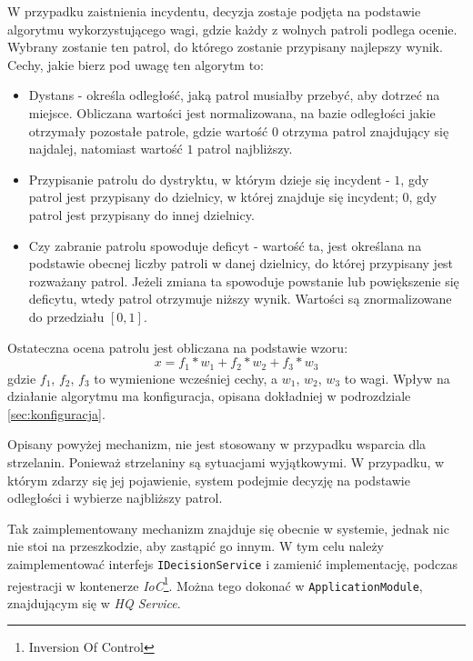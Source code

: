 \par W przypadku zaistnienia incydentu, decyzja zostaje podjęta na podstawie algorytmu wykorzystującego wagi, gdzie każdy z wolnych patroli podlega ocenie. Wybrany zostanie ten patrol, do którego zostanie przypisany najlepszy wynik. Cechy, jakie bierz pod uwagę ten algorytm to:
\begin{itemize}
    \item Dystans - określa odległość, jaką patrol musiałby przebyć, aby dotrzeć na miejsce. Obliczana wartości jest normalizowana, na bazie odległości jakie otrzymały pozostałe patrole, gdzie wartość $0$ otrzyma patrol znajdujący się najdalej, natomiast wartość $1$ patrol najbliższy.
    \item Przypisanie patrolu do dystryktu, w którym dzieje się incydent - $1$, gdy patrol jest przypisany do dzielnicy, w której znajduje się incydent; $0$, gdy patrol jest przypisany do innej dzielnicy.
    \item Czy zabranie patrolu spowoduje deficyt - wartość ta, jest określana na podstawie obecnej liczby patroli w danej dzielnicy, do której przypisany jest rozważany patrol. Jeżeli zmiana ta spowoduje powstanie lub powiększenie się deficytu, wtedy patrol otrzymuje niższy wynik. Wartości są znormalizowane do przedziału $[0,1]$. 
\end{itemize}

\par Ostateczna ocena patrolu jest obliczana na podstawie wzoru:
$$
x = f_1*w_1+f_2*w_2+f_3*w_3
$$
gdzie $f_1$, $f_2$, $f_3$ to wymienione wcześniej cechy, a $w_1$, $w_2$, $w_3$ to wagi. Wpływ na działanie algorytmu ma konfiguracja, opisana dokładniej w podrozdziale \ref{sec:konfiguracja}.

\par Opisany powyżej mechanizm, nie jest stosowany w przypadku wsparcia dla strzelanin. Ponieważ strzelaniny są sytuacjami wyjątkowymi. W przypadku, w którym zdarzy się jej pojawienie, system podejmie decyzję na podstawie odległości i wybierze najbliższy patrol.

\par Tak zaimplementowany mechanizm znajduje się obecnie w systemie, jednak nic nie stoi na przeszkodzie, aby zastąpić go innym. W tym celu należy zaimplementować interfejs \texttt{IDecisionService} i zamienić implementację, podczas rejestracji w kontenerze \emph{IoC}\footnote{Inversion Of Control}. Można tego dokonać w \texttt{ApplicationModule}, znajdującym się w \emph{HQ Service}.